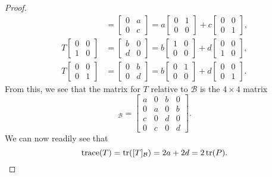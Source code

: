 \begin{proof}
\begin{align*}
    &=
    \begin{bmatrix}
      0 & a \\
      0 & c
    \end{bmatrix}
    = a
    \begin{bmatrix}
      0 & 1 \\
      0 & 0
    \end{bmatrix}
    + c
    \begin{bmatrix}
      0 & 0 \\
      0 & 1
    \end{bmatrix}, \\
    T
    \begin{bmatrix}
      0 & 0 \\
      1 & 0
    \end{bmatrix}
    &=
    \begin{bmatrix}
      b & 0 \\
      d & 0
    \end{bmatrix}
    = b
    \begin{bmatrix}
      1 & 0 \\
      0 & 0
    \end{bmatrix}
    + d
    \begin{bmatrix}
      0 & 0 \\
      1 & 0
    \end{bmatrix}, \\
    T
    \begin{bmatrix}
      0 & 0 \\
      0 & 1
    \end{bmatrix}
    &=
    \begin{bmatrix}
      0 & b \\
      0 & d
    \end{bmatrix}
    = b
    \begin{bmatrix}
      0 & 1 \\
      0 & 0
    \end{bmatrix}
    + d
    \begin{bmatrix}
      0 & 0 \\
      0 & 1
    \end{bmatrix}.
  \end{align*}
  From this, we see that the matrix for $T$ relative to $\mathcal{B}$
  is the $4\times4$ matrix
  \begin{equation*}
    [T]_{\mathcal{B}} =
    \begin{bmatrix}
      a & 0 & b & 0 \\
      0 & a & 0 & b \\
      c & 0 & d & 0 \\
      0 & c & 0 & d
    \end{bmatrix}.
  \end{equation*}
  We can now readily see that
  \begin{equation*}
    \operatorname{trace}(T) = \operatorname{tr}([T]_{\mathcal{B}}) = 2a + 2d = 2\operatorname{tr}(P). \qedhere
  \end{equation*}
\end{proof}

